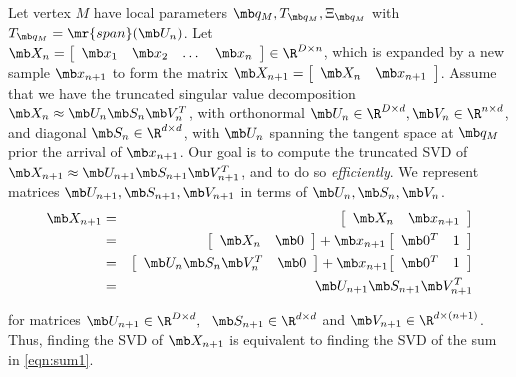 Let vertex $M$ have local parameters $\mb q_M, T_{\mb q_M}, \Xi_{\mb q_M}$ with $T_{\mb q_M} = \mr{span}(\mb U_n)$. Let $\mb X_n = \left[ \begin{array}{cccc} \mb x_1 & \mb x_2 & \dots & \mb x_n \end{array} \right] \in \R^{D \times n}$, which is expanded by a new sample $\mb x_{n+1}$ to form the matrix $\mb X_{n+1} = \left[ \begin{array}{cc} \mb X_n & \mb x_{n+1}
\end{array} \right]$. Assume that we have the truncated singular value decomposition $\mb X_n \approx \mb U_n \mb S_n \mb V_n^T$, with orthonormal $\mb U_n \in \R^{D \times d}, \mb V_n \in \R^{n \times d}$, and diagonal $\mb S_n \in \R^{d \times d}$, with $\mb U_n$ spanning the tangent space at $\mb q_M$ prior the arrival of $\mb x_{n+1}$. Our goal is to compute the truncated SVD of $\mb X_{n+1} \approx \mb U_{n+1} \mb S_{n+1} \mb V_{n+1}^T$, and to do so \emph{efficiently}. We represent matrices $\mb U_{n+1}, \mb S_{n+1}, \mb V_{n+1}$ in terms of $\mb U_n, \mb S_n, \mb V_n$. 
\begin{eqnarray}
    \mb X_{n+1} &=& 
    \left[ \begin{array}{cc} \mb X_n & \mb x_{n+1} \end{array} \right] \\
    &=& {\left[ \begin{array}{cc} \mb X_n & \mb 0 \end{array} \right]} + {\mb x_{n+1}} \left[ \begin{array}{cc} \mb 0^T & 1 \end{array} \right] \\
    &=& {\left[ \begin{array}{cc} \mb U_n \mb S_n \mb V^T_n & \mb 0 \end{array} \right]} + {\mb x_{n+1}} {\left[ \begin{array}{cc} \mb 0^T & 1 \end{array} \right]} \label{eqn:sum1} \\
    &=& \mb U_{n+1} \mb S_{n+1} \mb V^T_{n+1}
\end{eqnarray}

for matrices $\mb U_{n+1} \in \R^{D \times d}, ~~ \mb S_{n+1} \in \R^{d \times d}$ and $ \mb V_{n+1} \in \R^{d \times (n+1)}$. Thus, finding the SVD of $\mb X_{n+1}$ is equivalent to finding the SVD of the sum in \eqref{eqn:sum1}.





